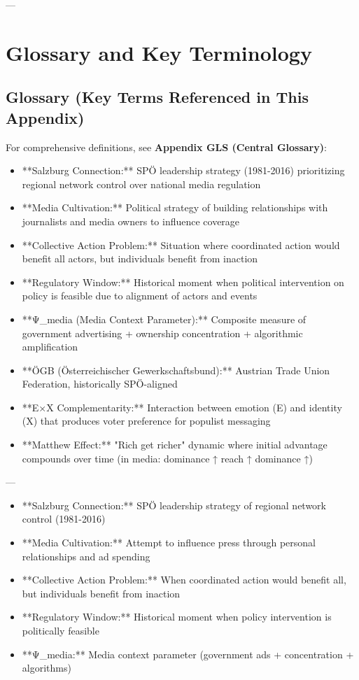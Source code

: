 {---


\section*{Glossary and Key Terminology}

\subsection*{Glossary (Key Terms Referenced in This Appendix)}

For comprehensive definitions, see \textbf{Appendix GLS (Central Glossary)}:

\begin{itemize}[nosep]
\item **Salzburg Connection:** SPÖ leadership strategy (1981-2016) prioritizing regional network control over national media regulation
\item **Media Cultivation:** Political strategy of building relationships with journalists and media owners to influence coverage
\item **Collective Action Problem:** Situation where coordinated action would benefit all actors, but individuals benefit from inaction
\item **Regulatory Window:** Historical moment when political intervention on policy is feasible due to alignment of actors and events
\item **Ψ_media (Media Context Parameter):** Composite measure of government advertising + ownership concentration + algorithmic amplification
\item **ÖGB (Österreichischer Gewerkschaftsbund):** Austrian Trade Union Federation, historically SPÖ-aligned
\item **E×X Complementarity:** Interaction between emotion (E) and identity (X) that produces voter preference for populist messaging
\item **Matthew Effect:** "Rich get richer" dynamic where initial advantage compounds over time (in media: dominance ↑ reach ↑ dominance ↑)
\end{itemize}

---

\begin{itemize}[nosep]
\item **Salzburg Connection:** SPÖ leadership strategy of regional network control (1981-2016)
\item **Media Cultivation:** Attempt to influence press through personal relationships and ad spending
\item **Collective Action Problem:** When coordinated action would benefit all, but individuals benefit from inaction
\item **Regulatory Window:** Historical moment when policy intervention is politically feasible
\item **Ψ_media:** Media context parameter (government ads + concentration + algorithms)
\end{itemize}

}
